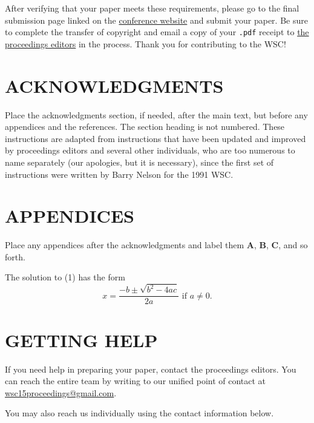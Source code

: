 \documentclass{wscpaperproc}
\theoremstyle{wsc}
\begin{document}
After verifying that your paper meets these requirements, please go to the final submission page linked on the \href{http://www.wintersim.org}{conference website} \cite{WSC} and submit your paper.
Be sure to complete the transfer of copyright and email a copy of your {\tt .pdf} receipt to \href{mailto://wsc15proceedings@gmail.com}{the proceedings editors} in the process.
Thank you for contributing to the WSC!

\section*{ACKNOWLEDGMENTS}
Place the acknowledgments section, if needed, after the main text, but before any appendices and the references. The section heading is not numbered.
These instructions are adapted from instructions that have been updated and improved by proceedings editors and several other individuals, who are too numerous to name separately (our apologies, but it is necessary), since the first set of instructions were written by Barry Nelson for the 1991 WSC.

\appendix

\section{APPENDICES} \label{app:quadratic}
Place any appendices after the acknowledgments and label them
\textbf{A}, \textbf{B}, \textbf{C}, and so forth.

The solution to (1) has the form
\begin{equation} \label{eq: quadratic sol}
x = \frac{-b \pm \sqrt{b^2-4ac}}{2a} \mbox{ if } a \ne 0.
\end{equation}

\section{GETTING HELP}
If you need help in preparing your paper, contact the proceedings editors. You can reach the entire team by writing to our unified point of contact at \href{mailto://wsc15proceedings@gmail.com}{wsc15proceedings@gmail.com}.

You may also reach us individually using the contact information below.

\vspace{6pt}
\end{document}

